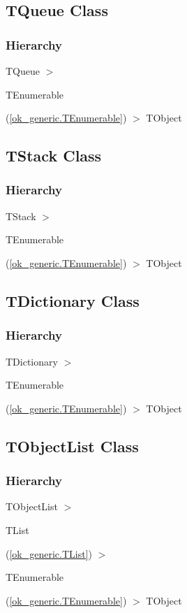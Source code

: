 \documentclass{report}
\begin{document}
\subsection*{TQueue Class}
\subsubsection*{\large{\textbf{Hierarchy}}\normalsize\hspace{1ex}\hfill}
TQueue {$>$} \begin{ttfamily}TEnumerable\end{ttfamily}(\ref{ok_generic.TEnumerable}) {$>$} 
TObject
\subsection*{TStack Class}
\subsubsection*{\large{\textbf{Hierarchy}}\normalsize\hspace{1ex}\hfill}
TStack {$>$} \begin{ttfamily}TEnumerable\end{ttfamily}(\ref{ok_generic.TEnumerable}) {$>$} 
TObject
\subsection*{TDictionary Class}
\subsubsection*{\large{\textbf{Hierarchy}}\normalsize\hspace{1ex}\hfill}
TDictionary {$>$} \begin{ttfamily}TEnumerable\end{ttfamily}(\ref{ok_generic.TEnumerable}) {$>$} 
TObject
\subsection*{TObjectList Class}
\subsubsection*{\large{\textbf{Hierarchy}}\normalsize\hspace{1ex}\hfill}
TObjectList {$>$} \begin{ttfamily}TList\end{ttfamily}(\ref{ok_generic.TList}) {$>$} \begin{ttfamily}TEnumerable\end{ttfamily}(\ref{ok_generic.TEnumerable}) {$>$} 
TObject
\end{document}
